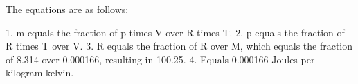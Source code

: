 The equations are as follows:

1. m equals the fraction of p times V over R times T.
2. p equals the fraction of R times T over V.
3. R equals the fraction of R over M, which equals the fraction of 8.314 over 0.000166, resulting in 100.25.
4. Equals 0.000166 Joules per kilogram-kelvin.